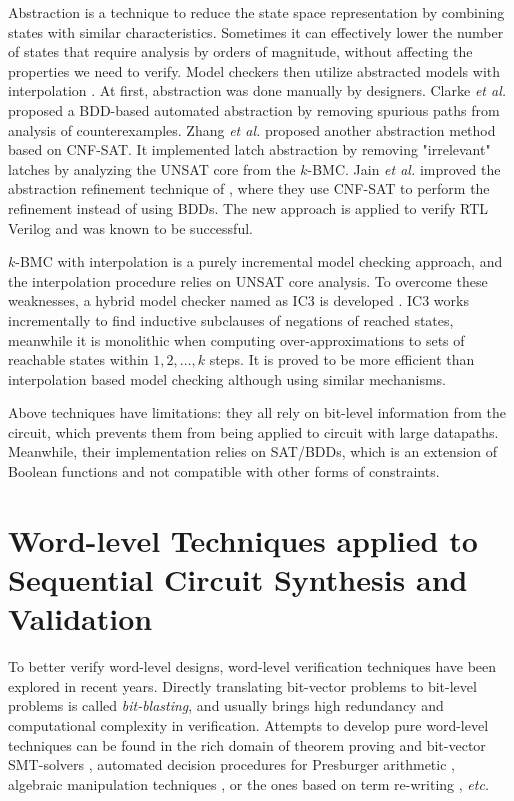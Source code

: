 Abstraction is a technique to reduce the state space representation by combining states with similar 
characteristics. Sometimes it can effectively lower the number of states that require analysis by orders of magnitude,
without affecting the properties we need to verify. Model checkers then utilize abstracted models 
with interpolation \cite{mcmillan2003interpolation,mcmillan:cav06}.
At first, abstraction was done manually by designers. Clarke {\it et al.} \cite{clarke2000counterexample}
proposed a BDD-based automated abstraction by removing spurious paths from analysis of counterexamples. 
Zhang {\it et al.} \cite{zhang2005design} proposed another abstraction method based on CNF-SAT.
It implemented latch abstraction by removing "irrelevant" latches by analyzing the 
UNSAT core from the $k$-BMC. Jain {\it et al.} \cite{HimanshuDAC2005} improved the abstraction refinement technique of \cite{clarke2000counterexample},
where they use CNF-SAT to perform the refinement instead of using BDDs. The new approach is applied to verify RTL Verilog
and was known to be successful.

$k$-BMC with interpolation is a purely incremental model checking approach, and the interpolation procedure relies
on UNSAT core analysis. To overcome these weaknesses, a hybrid model checker named as IC3 is developed 
\cite{bradley2011sat,bradley2011incremental}. IC3 works incrementally to find inductive subclauses
of negations of reached states, meanwhile it is monolithic when computing over-approximations to sets of reachable
states within $1,2,\dots,k$ steps. It is proved to be more efficient than interpolation based model checking
although using similar mechanisms.

Above techniques have limitations: they all rely on bit-level information from 
the circuit, which prevents them from being applied to circuit with large datapaths.
Meanwhile, their implementation relies on SAT/BDDs, which is an extension of Boolean 
functions and not compatible with other forms of constraints.

\section{Word-level Techniques applied to Sequential Circuit Synthesis and Validation}
To better verify word-level designs, word-level verification techniques have been 
explored in recent years. Directly translating bit-vector problems to bit-level 
problems is called {\it bit-blasting}, and usually brings high redundancy and computational complexity in verification.
Attempts to develop pure word-level techniques can be found in
the rich domain of 
theorem proving \cite{arditi:bmd} and bit-vector SMT-solvers
\cite{boolector,cvc3,z3,bitvector98}, automated
decision procedures for Presburger arithmetic \cite{presburger,bultan:mixed_verification}, 
algebraic manipulation techniques 
\cite{devadas:algebraic_manipulation_iccd91}, or the ones based on
term re-writing \cite{AST}, {\it etc.}

